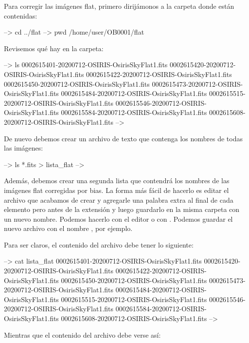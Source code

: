 Para corregir las imágenes flat, primero dirijámonos a la carpeta donde están contenidas:

\begin{shell}
--> cd ../flat
--> pwd
/home/user/OB0001/flat
\end{shell}

Revisemos qué hay en la carpeta:

\begin{shell}
--> ls
0002615401-20200712-OSIRIS-OsirisSkyFlat1.fits
0002615420-20200712-OSIRIS-OsirisSkyFlat1.fits
0002615422-20200712-OSIRIS-OsirisSkyFlat1.fits
0002615450-20200712-OSIRIS-OsirisSkyFlat1.fits
0002615473-20200712-OSIRIS-OsirisSkyFlat1.fits
0002615484-20200712-OSIRIS-OsirisSkyFlat1.fits
0002615515-20200712-OSIRIS-OsirisSkyFlat1.fits
0002615546-20200712-OSIRIS-OsirisSkyFlat1.fits
0002615584-20200712-OSIRIS-OsirisSkyFlat1.fits
0002615608-20200712-OSIRIS-OsirisSkyFlat1.fits
-->
\end{shell}

De nuevo debemos crear un archivo de texto que contenga los nombres de todas las imágenes:
\begin{shell}
--> ls *.fits > lista_flat
--> 
\end{shell}
Además, debemos crear una segunda lista que contendrá los nombres de las imágenes flat corregidas por bias. La forma más fácil de hacerlo es editar el archivo que acabamos de crear y agregarle una palabra extra al final de cada elemento pero antes de la extensión  y luego guardarlo en la misma carpeta con un nuevo nombre. Podemos hacerlo con el editor  o con . Podemos guardar el nuevo archivo con el nombre , por ejemplo. 

Para ser claros, el contenido del archivo  debe tener lo siguiente:

\begin{shell}
--> cat lista_flat
0002615401-20200712-OSIRIS-OsirisSkyFlat1.fits
0002615420-20200712-OSIRIS-OsirisSkyFlat1.fits
0002615422-20200712-OSIRIS-OsirisSkyFlat1.fits
0002615450-20200712-OSIRIS-OsirisSkyFlat1.fits
0002615473-20200712-OSIRIS-OsirisSkyFlat1.fits
0002615484-20200712-OSIRIS-OsirisSkyFlat1.fits
0002615515-20200712-OSIRIS-OsirisSkyFlat1.fits
0002615546-20200712-OSIRIS-OsirisSkyFlat1.fits
0002615584-20200712-OSIRIS-OsirisSkyFlat1.fits
0002615608-20200712-OSIRIS-OsirisSkyFlat1.fits
-->
\end{shell}

Mientras que el contenido del archivo  debe verse así:

